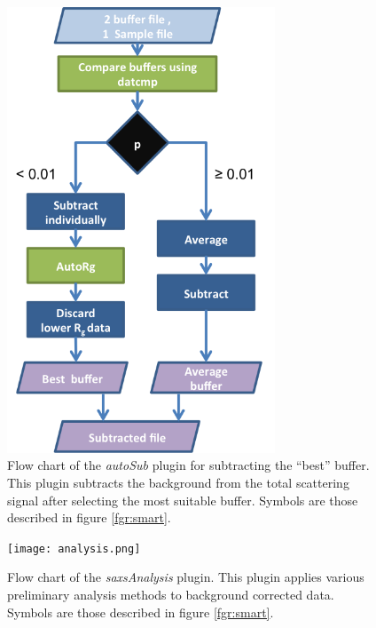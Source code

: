 \documentclass[preprint,pdf]{iucr}              %
\begin{document}
\begin{figure}
\centering
\includegraphics[width=8cm]{autosub.png}%
\caption{Flow chart of the \textit{autoSub} plugin for subtracting the ``best''
buffer.
This plugin subtracts the background from the total scattering signal after
selecting the most suitable buffer.
Symbols are those described in figure \ref{fgr:smart}.}
\label{fgr:autosub}
\end{figure}

\begin{figure}
\centering
\texttt{[image: analysis.png]}%
\caption{Flow chart of the \textit{saxsAnalysis} plugin.
This plugin applies various preliminary analysis methods to background
corrected data.
Symbols are those described in figure \ref{fgr:smart}.}\label{fgr:analysis}
\end{figure}
\end{document}
